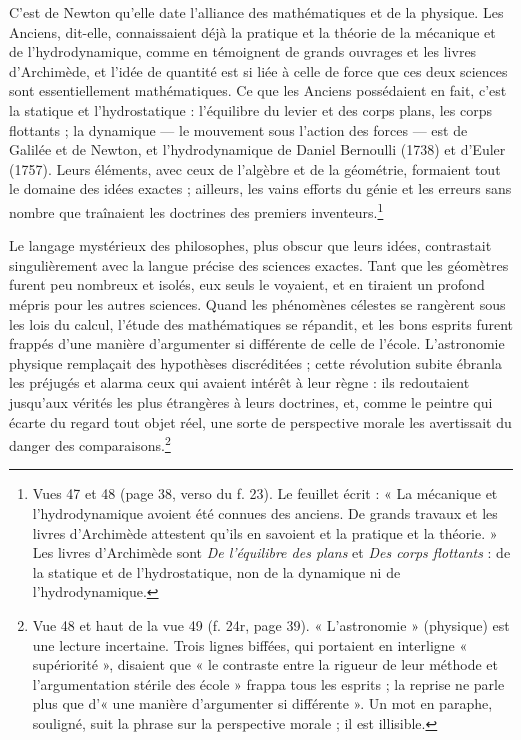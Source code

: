 \documentclass[11pt,a4paper]{article}
\begin{document}
C'est de Newton qu'elle date l'alliance des mathématiques et de la physique.
Les Anciens, dit-elle, connaissaient déjà la pratique et la théorie de la
mécanique et de l'hydrodynamique, comme en témoignent de grands ouvrages et les
livres d'Archimède, et l'idée de quantité est si liée à celle de force que ces
deux sciences sont essentiellement mathématiques. Ce que les Anciens
possédaient en fait, c'est la statique et l'hydrostatique : l'équilibre du
levier et des corps plans, les corps flottants ; la dynamique — le mouvement
sous l'action des forces — est de Galilée et de Newton, et l'hydrodynamique de
Daniel Bernoulli (1738) et d'Euler (1757). Leurs éléments, avec ceux de
l'algèbre et de la géométrie, formaient tout le domaine des idées exactes ;
ailleurs, les vains efforts du génie et les erreurs sans nombre que traînaient
les doctrines des premiers inventeurs.\footnote{Vues 47 et 48 (page 38, verso
du f. 23). Le feuillet écrit : « La mécanique et l'hydrodynamique avoient été
connues des anciens. De grands travaux et les livres d'Archimède attestent
qu'ils en savoient et la pratique et la théorie. » Les livres d'Archimède sont
\emph{De l'équilibre des plans} et \emph{Des corps flottants} : de la statique
et de l'hydrostatique, non de la dynamique ni de l'hydrodynamique.}

Le langage mystérieux des philosophes, plus obscur que leurs idées, contrastait
singulièrement avec la langue précise des sciences exactes. Tant que les
géomètres furent peu nombreux et isolés, eux seuls le voyaient, et en tiraient
un profond mépris pour les autres sciences. Quand les phénomènes célestes se
rangèrent sous les lois du calcul, l'étude des mathématiques se répandit, et les
bons esprits furent frappés d'une manière d'argumenter si différente de celle
de l'école. L'astronomie physique remplaçait des hypothèses discréditées ; cette
révolution subite ébranla les préjugés et alarma ceux qui avaient intérêt à leur
règne : ils redoutaient jusqu'aux vérités les plus étrangères à leurs doctrines,
et, comme le peintre qui écarte du regard tout objet réel, une sorte de
perspective morale les avertissait du danger des comparaisons.\footnote{Vue 48
et haut de la vue 49 (f. 24r, page 39). « L'astronomie » (physique) est une
lecture incertaine. Trois lignes biffées, qui portaient en interligne
« supériorité », disaient que « le contraste entre la rigueur de leur méthode et
l'argumentation stérile des école » frappa tous les esprits ; la reprise ne
parle plus que d'« une manière d'argumenter si différente ». Un mot en paraphe,
souligné, suit la phrase sur la perspective morale ; il est illisible.}
\end{document}
